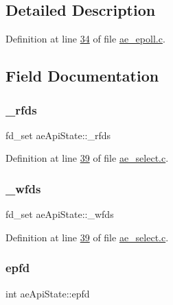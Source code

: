 \subsection{Detailed Description}


Definition at line \hyperlink{ae__epoll_8c_source_l00034}{34} of file \hyperlink{ae__epoll_8c_source}{ae\+\_\+epoll.\+c}.



\subsection{Field Documentation}
\mbox{\label{structaeApiState_ab9820d1695885949ecf0d2ce687a8568}} 
\subsubsection{\texorpdfstring{\+\_\+rfds}{\_rfds}}
{\footnotesize\ttfamily fd\+\_\+set ae\+Api\+State\+::\+\_\+rfds}



Definition at line \hyperlink{ae__select_8c_source_l00039}{39} of file \hyperlink{ae__select_8c_source}{ae\+\_\+select.\+c}.

\mbox{\label{structaeApiState_a112ee06858937f805534a328e3620327}} 
\subsubsection{\texorpdfstring{\+\_\+wfds}{\_wfds}}
{\footnotesize\ttfamily fd\+\_\+set ae\+Api\+State\+::\+\_\+wfds}



Definition at line \hyperlink{ae__select_8c_source_l00039}{39} of file \hyperlink{ae__select_8c_source}{ae\+\_\+select.\+c}.

\mbox{\label{structaeApiState_ad22cb6aa093b0606521178bee5fc9e57}} 
\subsubsection{\texorpdfstring{epfd}{epfd}}
{\footnotesize\ttfamily int ae\+Api\+State\+::epfd}




